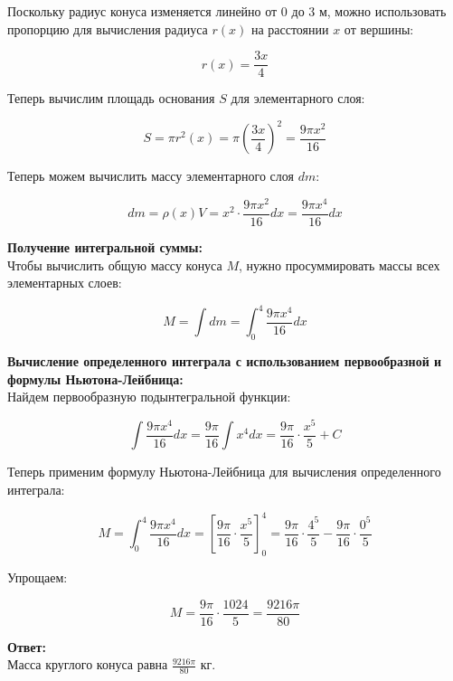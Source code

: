 \documentclass{article}
\begin{document}
Поскольку радиус конуса изменяется линейно от $0$ до $3$ м, можно использовать пропорцию для вычисления радиуса $r(x)$ на расстоянии $x$ от вершины:

$$
r(x) = \frac{3x}{4}
$$

Теперь вычислим площадь основания $S$ для элементарного слоя:

$$
S = \pi r^2(x) = \pi \left(\frac{3x}{4}\right)^2 = \frac{9\pi x^2}{16}
$$

Теперь можем вычислить массу элементарного слоя $dm$:

$$
dm = \rho(x) V = x^2 \cdot \frac{9\pi x^2}{16} dx = \frac{9\pi x^4}{16} dx
$$

\textbf{Получение интегральной суммы:} \\
Чтобы вычислить общую массу конуса $M$, нужно просуммировать массы всех элементарных слоев:

$$
M = \int dm = \int_{0}^{4} \frac{9\pi x^4}{16} dx
$$

\textbf{Вычисление определенного интеграла с использованием первообразной и формулы Ньютона-Лейбница:} \\
Найдем первообразную подынтегральной функции:

$$
\int \frac{9\pi x^4}{16} dx = \frac{9\pi}{16} \int x^4 dx = \frac{9\pi}{16} \cdot \frac{x^5}{5} + C
$$

Теперь применим формулу Ньютона-Лейбница для вычисления определенного интеграла:

$$
M = \int_{0}^{4} \frac{9\pi x^4}{16} dx = \left[\frac{9\pi}{16} \cdot \frac{x^5}{5}\right]_0^4 = \frac{9\pi}{16} \cdot \frac{4^5}{5} - \frac{9\pi}{16} \cdot \frac{0^5}{5}
$$

Упрощаем:

$$
M = \frac{9\pi}{16} \cdot \frac{1024}{5} = \frac{9216\pi}{80}
$$

\textbf{Ответ:} \\
Масса круглого конуса равна $\frac{9216\pi}{80}$ кг.
\end{document}
